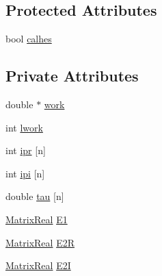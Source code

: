 \subsection*{Protected Attributes}
\begin{DoxyCompactItemize}
\item 
bool \hyperlink{classodes_1_1Matrices_3_01true_00_01true_00_01n_00_01nsub_00_01nsup_01_4_aea9e813e18fdb891846220218848e30f}{calhes}
\end{DoxyCompactItemize}
\subsection*{Private Attributes}
\begin{DoxyCompactItemize}
\item 
double $\ast$ \hyperlink{classodes_1_1Matrices_3_01true_00_01true_00_01n_00_01nsub_00_01nsup_01_4_a11aeb74270d9f8b97c708ef9bf226902}{work}
\item 
int \hyperlink{classodes_1_1Matrices_3_01true_00_01true_00_01n_00_01nsub_00_01nsup_01_4_a2baf43743a44b87d58721f54a25943a9}{lwork}
\item 
int \hyperlink{classodes_1_1Matrices_3_01true_00_01true_00_01n_00_01nsub_00_01nsup_01_4_aabee673416e9efcace8d863693484026}{ipr} \mbox{[}n\mbox{]}
\item 
int \hyperlink{classodes_1_1Matrices_3_01true_00_01true_00_01n_00_01nsub_00_01nsup_01_4_a007124102d8e6dd8bd2c8cfd6e457686}{ipi} \mbox{[}n\mbox{]}
\item 
double \hyperlink{classodes_1_1Matrices_3_01true_00_01true_00_01n_00_01nsub_00_01nsup_01_4_a77ab26be1470e62b364922691955a7b8}{tau} \mbox{[}n\mbox{]}
\item 
\hyperlink{classodes_1_1Matrices_3_01true_00_01true_00_01n_00_01nsub_00_01nsup_01_4_a9c13d85a737f0806d9cfff89d3d59c52}{Matrix\-Real} \hyperlink{classodes_1_1Matrices_3_01true_00_01true_00_01n_00_01nsub_00_01nsup_01_4_ab3bfa77eaa1898f5d2f4df4e99f52d3c}{E1}
\item 
\hyperlink{classodes_1_1Matrices_3_01true_00_01true_00_01n_00_01nsub_00_01nsup_01_4_a9c13d85a737f0806d9cfff89d3d59c52}{Matrix\-Real} \hyperlink{classodes_1_1Matrices_3_01true_00_01true_00_01n_00_01nsub_00_01nsup_01_4_a9d483886174270b6f19a1fae4ab151bc}{E2\-R}
\item 
\hyperlink{classodes_1_1Matrices_3_01true_00_01true_00_01n_00_01nsub_00_01nsup_01_4_a9c13d85a737f0806d9cfff89d3d59c52}{Matrix\-Real} \hyperlink{classodes_1_1Matrices_3_01true_00_01true_00_01n_00_01nsub_00_01nsup_01_4_a453b700b4f52c71243b25c845ee57700}{E2\-I}

\end{DoxyCompactItemize}
